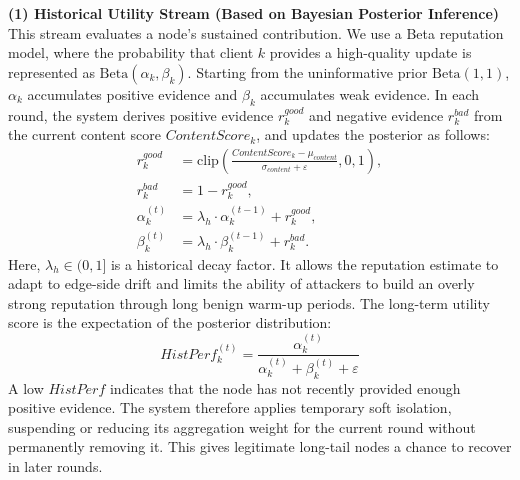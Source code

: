 \documentclass[final,5p,times,twocolumn]{elsarticle/elsarticle}
\begin{document}
\textbf{(1) Historical Utility Stream (Based on Bayesian Posterior Inference)}
This stream evaluates a node's sustained contribution. We use a Beta reputation model, where the probability that client $k$ provides a high-quality update is represented as $\text{Beta}(\alpha_k, \beta_k)$. Starting from the uninformative prior $\text{Beta}(1,1)$, $\alpha_k$ accumulates positive evidence and $\beta_k$ accumulates weak evidence. In each round, the system derives positive evidence $r_{k}^{good}$ and negative evidence $r_{k}^{bad}$ from the current content score $ContentScore_k$, and updates the posterior as follows:
\begin{align}
    r_{k}^{good}     & = \mathrm{clip}\left(\frac{ContentScore_{k} - \mu_{content}}{\sigma_{content} + \varepsilon}, 0, 1\right), \\
    r_{k}^{bad}      & = 1 - r_{k}^{good},                                                                                        \\
    \alpha_{k}^{(t)} & = \lambda_h \cdot \alpha_{k}^{(t-1)} + r_{k}^{good},                                                       \\
    \beta_{k}^{(t)}  & = \lambda_h \cdot \beta_{k}^{(t-1)} + r_{k}^{bad}.
\end{align}
Here, $\lambda_h \in (0,1]$ is a historical decay factor. It allows the reputation estimate to adapt to edge-side drift and limits the ability of attackers to build an overly strong reputation through long benign warm-up periods. The long-term utility score is the expectation of the posterior distribution:
\begin{equation}
    HistPerf_{k}^{(t)} = \frac{\alpha_{k}^{(t)}}{\alpha_{k}^{(t)} + \beta_{k}^{(t)} + \varepsilon}
\end{equation}
A low $HistPerf$ indicates that the node has not recently provided enough positive evidence. The system therefore applies temporary soft isolation, suspending or reducing its aggregation weight for the current round without permanently removing it. This gives legitimate long-tail nodes a chance to recover in later rounds.
\end{document}
